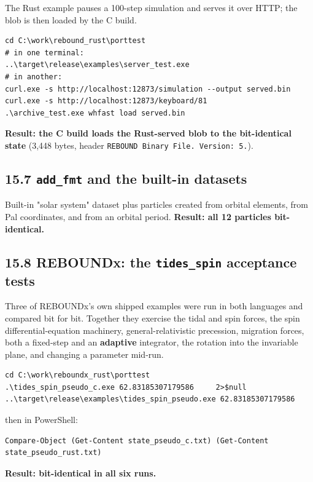 \documentclass[11pt]{article}
\begin{document}
The Rust example pauses a 100-step simulation and serves it over HTTP; the blob is then loaded by the C build.

\begin{lstlisting}
cd C:\work\rebound_rust\porttest
# in one terminal:
..\target\release\examples\server_test.exe
# in another:
curl.exe -s http://localhost:12873/simulation --output served.bin
curl.exe -s http://localhost:12873/keyboard/81
.\archive_test.exe whfast load served.bin
\end{lstlisting}

\textbf{Result: the C build loads the Rust-served blob to the bit-identical state} (3,448 bytes, header \texttt{REBOUND Binary File. Version: 5.}).

\subsection{15.7 \texttt{add\_fmt} and the built-in datasets}

Built-in "solar system" dataset plus particles created from orbital elements, from Pal coordinates, and from an orbital period. \textbf{Result: all 12 particles bit-identical.}

\subsection{15.8 REBOUNDx: the \texttt{tides\_spin} acceptance tests}

Three of REBOUNDx's own shipped examples were run in both languages and compared bit for bit. Together they exercise the tidal and spin forces, the spin differential-equation machinery, general-relativistic precession, migration forces, both a fixed-step and an \textbf{adaptive} integrator, the rotation into the invariable plane, and changing a parameter mid-run.

\begin{lstlisting}
cd C:\work\reboundx_rust\porttest
.\tides_spin_pseudo_c.exe 62.83185307179586     2>$null
..\target\release\examples\tides_spin_pseudo.exe 62.83185307179586
\end{lstlisting}

then in PowerShell:

\begin{lstlisting}
Compare-Object (Get-Content state_pseudo_c.txt) (Get-Content state_pseudo_rust.txt)
\end{lstlisting}

\textbf{Result: bit-identical in all six runs.}
\end{document}
